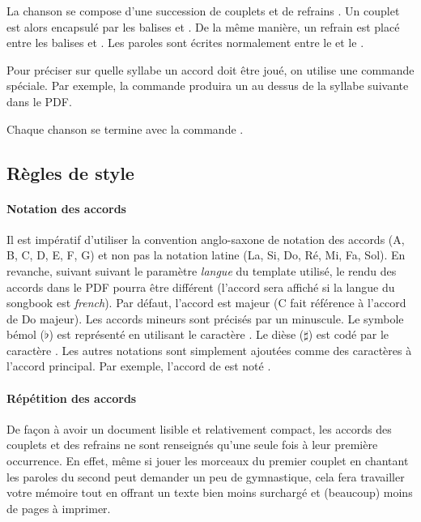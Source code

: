 La chanson se compose d'une succession de couplets  et
de refrains . Un couplet est alors encapsulé par les
balises  et . De la même
manière, un refrain est placé entre les balises 
et . Les paroles sont écrites normalement entre le
 et le .

Pour préciser sur quelle syllabe un accord doit être joué, on utilise
une commande spéciale. Par exemple, la commande \latexcom{[E]}
produira un  au dessus de la syllabe suivante dans le PDF.

\begin{songbook}
\beginverse
  His \[Dm]steely skin is covered
  By \[F]centuries of dust
  \[C]Once he was a great one
  \[Dm]Now he's dull and rust
\endverse
\end{songbook}

Chaque chanson se termine avec la commande .

\subsection{Règles de style}

\paragraph{Notation des accords}
Il est impératif d'utiliser la convention anglo-saxone de notation des
accords (A, B, C, D, E, F, G) et non pas la notation latine (La, Si,
Do, Ré, Mi, Fa, Sol). En revanche, suivant suivant le paramètre
\emph{langue} du template utilisé, le rendu des accords dans le PDF
pourra être différent (l'accord \latexcom{[D]} sera affiché
 si la langue du songbook est \emph{french}). Par défaut,
l'accord est majeur (C fait référence à l'accord de Do majeur). Les
accords mineurs sont précisés par un  minuscule.  Le
symbole bémol ($\flat$) est représenté en utilisant le caractère
\command{\&}. Le dièse ($\sharp$) est codé par le caractère
\command{\#}. Les autres notations sont simplement ajoutées comme des
caractères à l'accord principal. Par exemple, l'accord de  est noté \latexcom{[A\&m]}.

\paragraph{Répétition des accords}
De façon à avoir un document lisible et relativement compact, les
accords des couplets et des refrains ne sont renseignés qu'une seule
fois à leur première occurrence. En effet, même si jouer les morceaux
du premier couplet en chantant les paroles du second peut demander un
peu de gymnastique, cela fera travailler votre mémoire tout en offrant
un texte bien moins surchargé et (beaucoup) moins de pages à imprimer.

